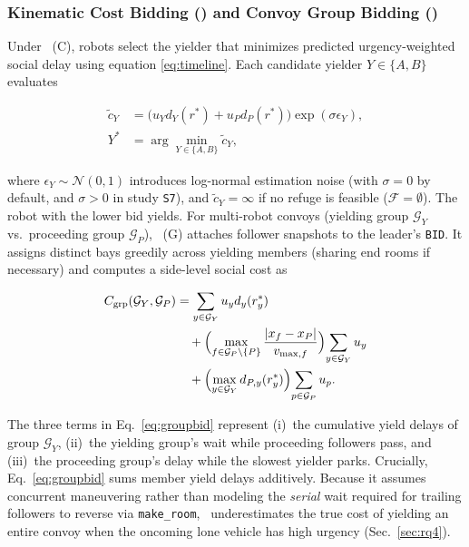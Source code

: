 \subsubsection{Kinematic Cost Bidding (\cb) and Convoy Group Bidding (\gb)}
Under \cb\ (C), robots select the yielder that minimizes predicted urgency-weighted social delay using equation \eqref{eq:timeline}. Each candidate yielder $Y \in \{A, B\}$ evaluates

\begin{equation}
\begin{aligned}
\tilde{c}_Y &= \bigl(u_Y d_Y(r^\ast) + u_P d_P(r^\ast)\bigr)\exp(\sigma \epsilon_Y), \\
Y^\ast &= \arg\min_{Y\in\{A,B\}} \tilde{c}_Y,
\end{aligned}
\label{eq:costbid}
\end{equation}

where $\epsilon_Y \sim \mathcal{N}(0,1)$ introduces log-normal estimation noise (with $\sigma = 0$ by default, and $\sigma > 0$ in study \texttt{S7}), and $\tilde{c}_Y = \infty$ if no refuge is feasible ($\mathcal{F}=\emptyset$). The robot with the lower bid yields.
For multi-robot convoys (yielding group $\mathcal{G}_Y$ vs.\ proceeding group $\mathcal{G}_P$), \gb\ (G) attaches follower snapshots to the leader's \texttt{BID}. It assigns distinct bays greedily across yielding members (sharing end rooms if necessary) and computes a side-level social cost as

\begin{equation}
\begin{aligned}
C_{\mathrm{grp}}(\mathcal{G}_Y,\mathcal{G}_P) &= \sum_{y\in\mathcal{G}_Y} u_y d_y(r_y^\ast) \\
&\quad + \Bigl(\max_{f\in\mathcal{G}_P\setminus\{P\}}\frac{|x_f-x_P|}{v_{\max,f}}\Bigr)\!\sum_{y\in\mathcal{G}_Y} u_y \\
&\quad + \Bigl(\max_{y\in\mathcal{G}_Y} d_{P,y}(r_y^\ast)\Bigr)\!\sum_{p\in\mathcal{G}_P} u_p.
\end{aligned}
\label{eq:groupbid}
\end{equation}

The three terms in Eq.~\eqref{eq:groupbid} represent (i)~the cumulative yield delays of group $\mathcal{G}_Y$, (ii)~the yielding group's wait while proceeding followers pass, and (iii)~the proceeding group's delay while the slowest yielder parks.
Crucially, Eq.~\eqref{eq:groupbid} sums member yield delays additively. Because it assumes concurrent maneuvering rather than modeling the \emph{serial} wait required for trailing followers to reverse via \texttt{make\_room}, \gb\ underestimates the true cost of yielding an entire convoy when the oncoming lone vehicle has high urgency (Sec.~\ref{sec:rq4}).


